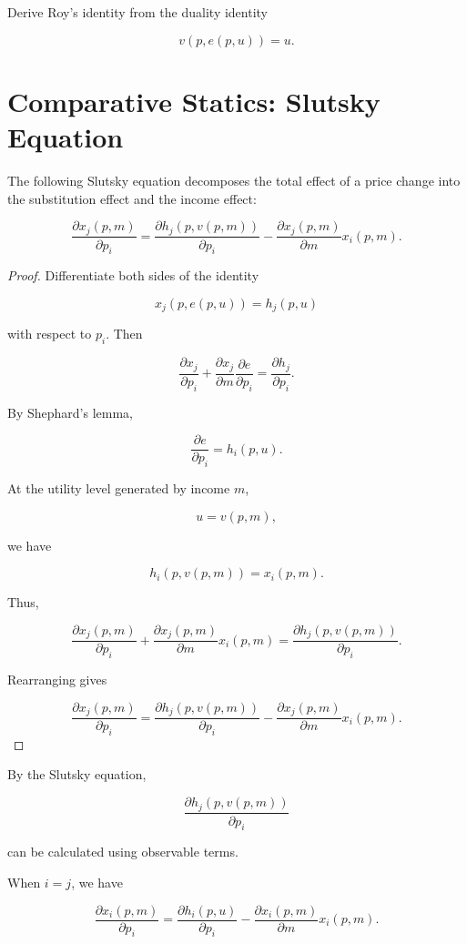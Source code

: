\begin{exercise}
Derive Roy's identity from the duality identity

\[
v(p,e(p,u))=u.
\]
\end{exercise}

\section{Comparative Statics: Slutsky Equation}

The following Slutsky equation decomposes the total effect of a price change into the substitution effect and the income effect:

\[
\frac{\partial x_j(p,m)}{\partial p_i}
=
\frac{\partial h_j(p,v(p,m))}{\partial p_i}
-
\frac{\partial x_j(p,m)}{\partial m}x_i(p,m).
\]

\begin{proof}
Differentiate both sides of the identity

\[
x_j(p,e(p,u))=h_j(p,u)
\]

with respect to \(p_i\). Then

\[
\frac{\partial x_j}{\partial p_i}
+
\frac{\partial x_j}{\partial m}
\frac{\partial e}{\partial p_i}
=
\frac{\partial h_j}{\partial p_i}.
\]

By Shephard's lemma,

\[
\frac{\partial e}{\partial p_i}
=
h_i(p,u).
\]

At the utility level generated by income \(m\),

\[
u=v(p,m),
\]

we have

\[
h_i(p,v(p,m))=x_i(p,m).
\]

Thus,

\[
\frac{\partial x_j(p,m)}{\partial p_i}
+
\frac{\partial x_j(p,m)}{\partial m}x_i(p,m)
=
\frac{\partial h_j(p,v(p,m))}{\partial p_i}.
\]

Rearranging gives

\[
\frac{\partial x_j(p,m)}{\partial p_i}
=
\frac{\partial h_j(p,v(p,m))}{\partial p_i}
-
\frac{\partial x_j(p,m)}{\partial m}x_i(p,m).
\]
\end{proof}

By the Slutsky equation,

\[
\frac{\partial h_j(p,v(p,m))}{\partial p_i}
\]

can be calculated using observable terms.

When \(i=j\), we have

\[
\frac{\partial x_i(p,m)}{\partial p_i}
=
\frac{\partial h_i(p,u)}{\partial p_i}
-
\frac{\partial x_i(p,m)}{\partial m}x_i(p,m).
\]

